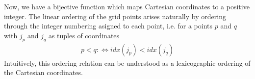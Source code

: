 Now, we have a bijective function which maps Cartesian coordinates to a positive integer. The linear ordering of the grid points arises naturally by ordering through the integer numbering asigned to each point, i.e. for a points \(p\) and \(q\)  with \(j_p\) and \(j_q\) as tuples of coordinates
\begin{align*}
    p < q :\iff idx(j_p) < idx(j_q)
\end{align*}
Intuitively, this ordering relation can be understood as a lexicographic ordering of the Cartesian coordinates.


